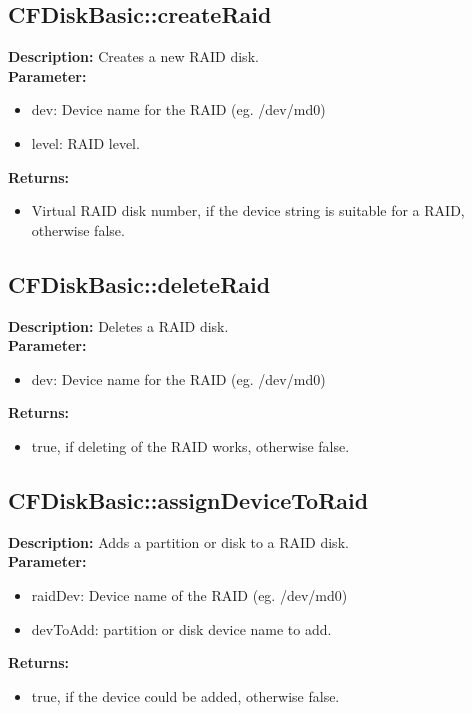 \subsection{CFDiskBasic::createRaid}
\textbf{Description:} Creates a new RAID disk.\\
\textbf{Parameter:}
\begin{itemize}
\item dev: Device name for the RAID (eg. /dev/md0)
\item level: RAID level.
\end{itemize}
\textbf{Returns:}
\begin{itemize}
\item Virtual RAID disk number, if the device string is suitable for a RAID, otherwise false.
\end{itemize}

\subsection{CFDiskBasic::deleteRaid}
\textbf{Description:} Deletes a RAID disk.\\
\textbf{Parameter:}
\begin{itemize}
\item dev: Device name for the RAID (eg. /dev/md0)
\end{itemize}
\textbf{Returns:}
\begin{itemize}
\item true, if deleting of the RAID works, otherwise false.
\end{itemize}

\subsection{CFDiskBasic::assignDeviceToRaid}
\textbf{Description:} Adds a partition or disk to a RAID disk.\\
\textbf{Parameter:}
\begin{itemize}
\item raidDev: Device name of the RAID (eg. /dev/md0)
\item devToAdd: partition or disk device name to add.
\end{itemize}
\textbf{Returns:}
\begin{itemize}
\item true, if the device could be added, otherwise false.
\end{itemize}

